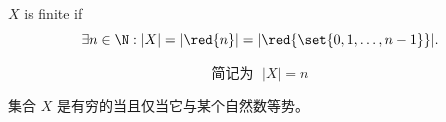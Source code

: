 
\begin{frame}{}
  \begin{definition}[Finite]
    $X$ is finite if
    \[
      \exists n \in \N: |X| = |\red{n}| = |\red{\set{0, 1, \dots, n-1}}|.
    \]
  \end{definition}

  \pause
  \vspace{0.20cm}
  \[
    \text{简记为 }\; |X| = n
  \]

  \pause
  \vspace{0.30cm}
  \begin{center}
    集合 $X$ 是有穷的当且仅当它与某个自然数等势。
  \end{center}


\end{frame}

